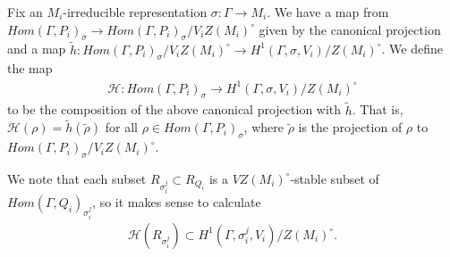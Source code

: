 Fix an $M_i$-irreducible representation $\sigma: \Gamma \rightarrow M_i$. We have a map from $Hom(\Gamma, P_i)_\sigma \rightarrow Hom(\Gamma, P_i)_\sigma / V_i Z(M_i)^\circ$ given by the canonical projection and a map $\tilde{h}: Hom(\Gamma, P_i)_\sigma / V_i Z(M_i)^\circ \rightarrow H^1(\Gamma, \sigma, V_i)/Z(M_i)^\circ$. We define the map
\begin{align*}
  \mathcal{H}: Hom(\Gamma, P_i)_\sigma \rightarrow H^1(\Gamma, \sigma, V_i) / Z(M_i)^\circ
\end{align*}
to be the composition of the above canonical projection with $\tilde{h}$. That is, $\mathcal{H}(\rho) = \tilde{h}(\tilde{\rho})$ for all $\rho \in Hom(\Gamma, P_i)_\sigma$, where $\tilde{\rho}$ is the projection of $\rho$ to $Hom(\Gamma, P_i)_\sigma / V_i Z(M_i)^\circ$.

We note that each subset $R_{\sigma_i^j} \subset R_{Q_i}$ is a $VZ(M_i)^\circ$-stable subset of $Hom(\Gamma, Q_i)_{\sigma_i^j}$, so it makes sense to calculate
\begin{align*}
  \mathcal{H}(R_{\sigma_i^j}) \subset H^1(\Gamma, \sigma_i^j, V_i) / Z(M_i)^\circ.
\end{align*}

